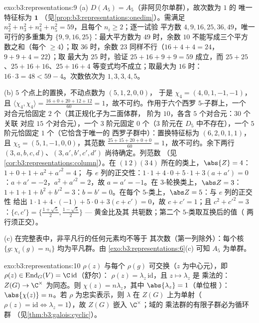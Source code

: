 \begin{solution}{exo:b3:representations:9}
(a) $D(A_5) = A_5$（非阿贝尔单群），故次数为 $1$ 的
唯一特征标为 $\mathbf 1$
（见\cref{prop:b3:representations:onedim}）。需满足 $n_2^2 + n_3^2
+ n_4^2 + n_5^2 = 59$，且每个 $n_i \geq 2$；逐一试验
平方数 $4, 9, 16, 25, 36, 49$，唯一可行的多重集为
$\{9, 9, 16, 25\}$：最大平方数为 $49$ 时，余数 $10$
不能写成三个平方数之和（每个 $\geq 4$）；取 $36$ 时，余数
$23$ 同样不行（$16 + 4 + 4 = 24$，$9 + 9 + 4 = 22$）；取
最大为 $25$ 时，验证 $25 + 16 + 9 + 9 = 59$ 成立，而 $25 +
25$、$25 + 16 + 16$、$25 + 16 + 4$ 等变式均不成立；取最大为
$16$ 时：$16\cdot3 = 48 < 59 - 4$。次数依次为 $1, 3, 3, 4, 5$。

(b) $5$ 个点上的置换，不动点数为 $(5, 1, 2, 0, 0)$，
于是 $\chi_4 = (4, 0, 1, -1, -1)$，且
$\langle\chi_4,\chi_4\rangle = \frac{16 + 0 + 20 + 12 + 12}{60}
= 1$，故不可约。作用于六个西罗 $5$-子群上，一个
对合元恰固定 $2$ 个（其正规化子为二面体群，
阶为 $10$，各含 $5$ 个对合元：$30$ 个关联
对应 $15$ 个对合元），一个 $3$ 阶元固定 $0$ 个（$3$ 阶元在
$D_5$ 中不存在），一个 $5$ 阶元恰固定 $1$ 个（它恰含于唯一的
西罗子群中）：置换特征标为 $(6, 2, 0, 1, 1)$，且 $\chi_5 =
(5, 1, -1, 0, 0)$，其范数 $\frac{25 + 15 + 20 + 0 + 0}{60} =
1$，故不可约。余下两行 $(3, a, b, c, d)$、$(3, a', b', c',
d')$ 尚待确定。列范数
（见\cref{cor:b3:representations:column}）。在
$(1\,2)(3\,4)$ 所在的类上，$\abs{Z} = 4$：$1 + 0 + 1 + a^2 + a'^2 = 4$；
与 $e$ 列的正交性：$1\cdot1 + 4\cdot 0 + 5\cdot1 + 3(a + a') =
0$：$a + a' = -2$，$a^2 + a'^2 = 2$，故 $a = a' = -1$。在
$3$-轮换类上，$\abs Z = 3$：$1 + 1 + 1 + b^2 + b'^2 = 3$：$b = b'
= 0$。在每个 $5$-类上，$\abs Z = 5$：与 $e$ 列的正交性
给出 $1\cdot 1 + 4\cdot(-1) + 5\cdot 0 + 3(c + c') = 0$，故
$c + c' = 1$；且
$c^2 + c'^2 = 3$：$\{c, c'\} = \bigl\{\frac{1+\sqrt5}2,
\frac{1-\sqrt5}2\bigr\}$ --- 黄金比及其
共轭数；第二个 $5$-类取互换后的值（
两行须正交）。

(c) 在完整表中，非平凡行的任何元素均不等于
其次数（第一列除外）：每个核 $\{g :
\chi_i(g) = n_i\}$ 均为平凡群。由
\cref{exo:b3:representations:6}(c) 可知 $A_5$ 为单群。
\end{solution}

\begin{solution}{exo:b3:representations:10}
$\rho(z)$ 与每个 $\rho(g)$ 可交换（$z$ 为中心元），即\
$\rho(z) \in \operatorname{End}_G(V) = \C\,\mathrm{id}$（舒尔）：
$\rho(z) = \lambda_z\,\mathrm{id}$，且 $z \mapsto \lambda_z$ 是
乘法的：$Z(G) \to \C^\times$ 为同态。则
$\chi(z) = n\lambda_z$，其中 $\abs{\lambda_z} = 1$（单位根
）：$\abs{\chi(z)} = n$。若 $\rho$ 为忠实表示，则 $\lambda$ 在
$Z(G)$ 上为单射（$\rho(z) = \mathrm{id} \iff \lambda_z =
1$），故 $Z(G)$ 嵌入 $\C^\times$；域的
乘法群的有限子群必为循环群
（见\cref{thm:b3:galois:cyclic}）。
\end{solution}


